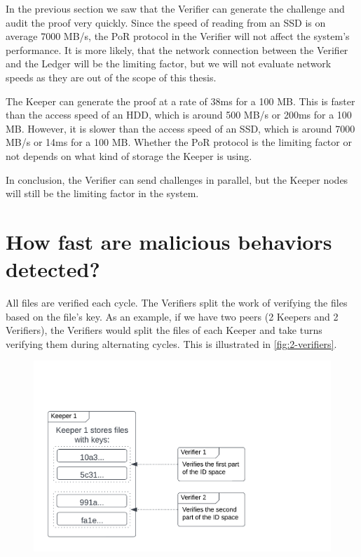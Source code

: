 In the previous section we saw that the Verifier can generate the challenge and audit the proof very quickly.
Since the speed of reading from an SSD is on average 7000 MB/s, the PoR protocol in the Verifier
will not affect the system's performance.
It is more likely, that the network connection between the Verifier and the Ledger will be the limiting factor,
but we will not evaluate network speeds as they are out of the scope of this thesis.

The Keeper can generate the proof at a rate of 38ms for a 100 MB.
This is faster than the access speed of an HDD, which is around 500 MB/s or 200ms for a 100 MB.
However, it is slower than the access speed of an SSD, which is around 7000 MB/s or 14ms for a 100 MB.
Whether the PoR protocol is the limiting factor or not depends on what kind of storage the Keeper is using.

In conclusion, the Verifier can send challenges in parallel, but the Keeper nodes will still be
the limiting factor in the system.

\section{How fast are malicious behaviors detected?}

All files are verified each cycle.
The Verifiers split the work of verifying the files based on the file's key.
As an example, if we have two peers (2 Keepers and 2 Verifiers),
the Verifiers would split the files of each Keeper and take turns verifying them
during alternating cycles.
This is illustrated in \autoref{fig:2-verifiers}.

\begin{figure}
    \centering
    \includegraphics[width=350pt]{gfx/2-verifiers.png}
    \label{fig:2-verifiers}
\end{figure}

